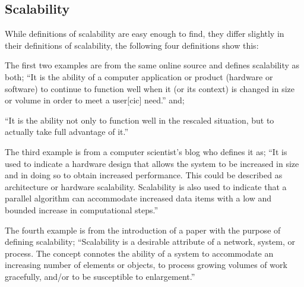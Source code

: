 \subsection{Scalability} \label{subsec:scalability_def}
While definitions of scalability are easy enough to find, they differ slightly in their definitions of scalability, the following four definitions show this:

The first two examples are from the same online source and defines scalability as both;
``It is the ability of a computer application or product (hardware or software) to continue to function well when it (or its context) is changed in size or volume in order to meet a user[cic] need.''
and;

``It is the ability not only to function well in the rescaled situation, but to actually take full advantage of it.''
\cite{scaleDef1}

The third example is from a computer scientist's blog who defines it as;
``It is used to indicate a hardware design that allows the system to be increased in size and in doing so to obtain increased performance. This could be described as architecture or hardware scalability. Scalability is also used to indicate that a parallel algorithm can accommodate increased data items with a low and bounded increase in computational steps.''
\cite{scaleDef2}

The fourth example is from the introduction of a paper with the purpose of defining scalability;
``Scalability is a desirable attribute of a network, system, or
process. The concept connotes the ability of a system to
accommodate an increasing number of elements or objects, to
process growing volumes of work gracefully, and/or to be
susceptible to enlargement.''
\cite{scaleDef3}

